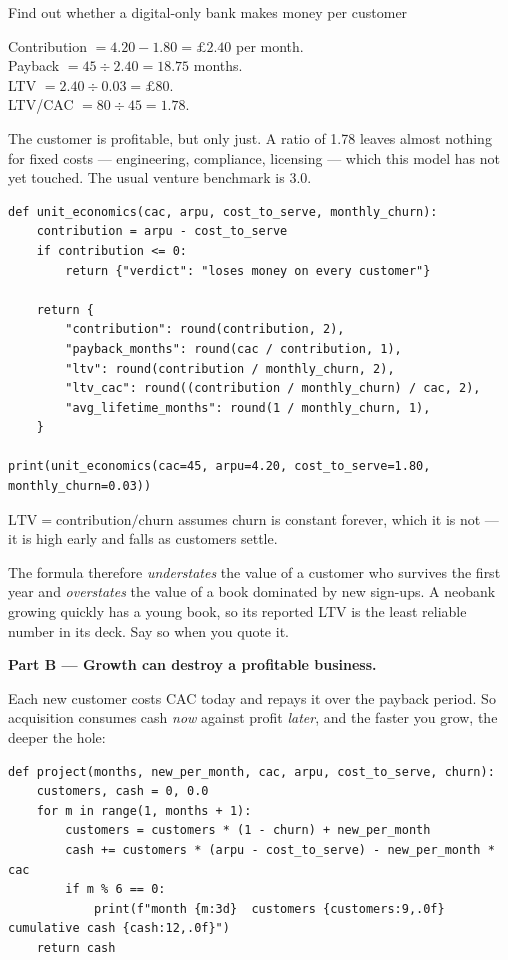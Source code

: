 \begin{labproject}{Find out whether a digital-only bank makes money per customer}
\begin{workedexample}
\smallskip
Contribution $= 4.20 - 1.80 = \pounds2.40$ per month.\\
Payback $= 45 \div 2.40 = 18.75$ months.\\
LTV $= 2.40 \div 0.03 = \pounds80$.\\
LTV/CAC $= 80 \div 45 = 1.78$.

\smallskip
The customer is profitable, but only just. A ratio of 1.78 leaves almost nothing for fixed costs --- engineering, compliance, licensing --- which this model has not yet touched. The usual venture benchmark is 3.0.
\end{workedexample}

\begin{lstlisting}[style=utppython]
def unit_economics(cac, arpu, cost_to_serve, monthly_churn):
    contribution = arpu - cost_to_serve
    if contribution <= 0:
        return {"verdict": "loses money on every customer"}

    return {
        "contribution": round(contribution, 2),
        "payback_months": round(cac / contribution, 1),
        "ltv": round(contribution / monthly_churn, 2),
        "ltv_cac": round((contribution / monthly_churn) / cac, 2),
        "avg_lifetime_months": round(1 / monthly_churn, 1),
    }

print(unit_economics(cac=45, arpu=4.20, cost_to_serve=1.80, monthly_churn=0.03))
\end{lstlisting}

\begin{pitfall}
$\text{LTV} = \text{contribution} / \text{churn}$ assumes churn is constant forever, which it is not --- it is high early and falls as customers settle.

The formula therefore \emph{understates} the value of a customer who survives the first year and \emph{overstates} the value of a book dominated by new sign-ups. A neobank growing quickly has a young book, so its reported LTV is the least reliable number in its deck. Say so when you quote it.
\end{pitfall}

\medskip\noindent\textbf{Part B --- Growth can destroy a profitable business.}\par
Each new customer costs CAC today and repays it over the payback period. So acquisition consumes cash \emph{now} against profit \emph{later}, and the faster you grow, the deeper the hole:

\begin{lstlisting}[style=utppython]
def project(months, new_per_month, cac, arpu, cost_to_serve, churn):
    customers, cash = 0, 0.0
    for m in range(1, months + 1):
        customers = customers * (1 - churn) + new_per_month
        cash += customers * (arpu - cost_to_serve) - new_per_month * cac
        if m % 6 == 0:
            print(f"month {m:3d}  customers {customers:9,.0f}  cumulative cash {cash:12,.0f}")
    return cash


\end{lstlisting}
\end{labproject}
